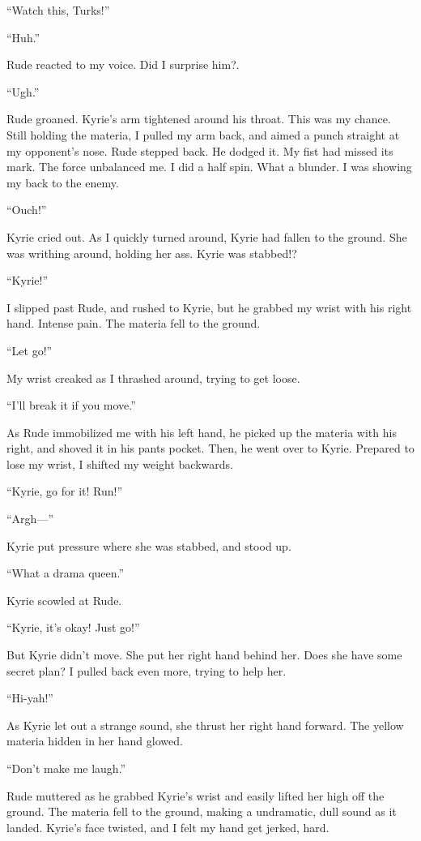 \documentclass[oneside]{book}
\begin{document}
“Watch this, Turks!”

“Huh.”

Rude reacted to my voice. Did I surprise him?.

“Ugh.”

Rude groaned. Kyrie’s arm tightened around his throat. This was my chance. Still holding the materia, I pulled my arm back, and aimed a punch straight at my opponent’s nose. Rude stepped back. He dodged it. My fist had missed its mark. The force unbalanced me. I did a half spin. What a blunder. I was showing my back to the enemy.

“Ouch!”

Kyrie cried out. As I quickly turned around, Kyrie had fallen to the ground. She was writhing around, holding her ass. Kyrie was stabbed!?

“Kyrie!”

I slipped past Rude, and rushed to Kyrie, but he grabbed my wrist with his right hand. Intense pain. The materia fell to the ground.

“Let go!”

My wrist creaked as I thrashed around, trying to get loose.

“I’ll break it if you move.”

As Rude immobilized me with his left hand, he picked up the materia with his right, and shoved it in his pants pocket. Then, he went over to Kyrie. Prepared to lose my wrist, I shifted my weight backwards.

“Kyrie, go for it! Run!”

“Argh—”

Kyrie put pressure where she was stabbed, and stood up.

“What a drama queen.”

Kyrie scowled at Rude.

“Kyrie, it’s okay! Just go!”

But Kyrie didn’t move. She put her right hand behind her. Does she have some secret plan? I pulled back even more, trying to help her.

“Hi-yah!”

As Kyrie let out a strange sound, she thrust her right hand forward. The yellow materia hidden in her hand glowed.

“Don’t make me laugh.”

Rude muttered as he grabbed Kyrie’s wrist and easily lifted her high off the ground. The materia fell to the ground, making a undramatic, dull sound as it landed. Kyrie’s face twisted, and I felt my hand get jerked, hard.
\end{document}
